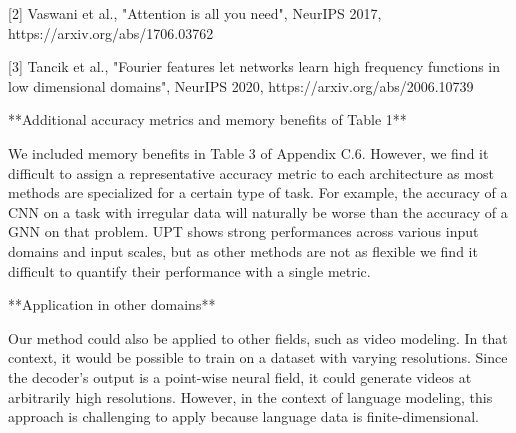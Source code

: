 [2] Vaswani et al., "Attention is all you need", NeurIPS 2017, https://arxiv.org/abs/1706.03762

[3] Tancik et al., "Fourier features let networks learn high frequency functions in low dimensional domains", NeurIPS 2020, https://arxiv.org/abs/2006.10739



**Additional accuracy metrics and memory benefits of Table 1**

We included memory benefits in Table 3 of Appendix C.6. However, we find it difficult to assign a representative accuracy metric to each architecture
as most methods are specialized for a certain type of task. For example, the accuracy of a CNN on a task with irregular data will naturally be worse than the accuracy of a GNN on that problem. UPT shows strong performances across various input domains and input scales, but as other methods are not as flexible we find it difficult to quantify their performance with a single metric.


**Application in other domains**

Our method could also be applied to other fields, such as video modeling. In that context, it would be possible to train on a dataset with varying resolutions. Since the decoder's output is a point-wise neural field, it could generate videos at arbitrarily high resolutions.
However, in the context of language modeling, this approach is challenging to apply because language data is finite-dimensional.


